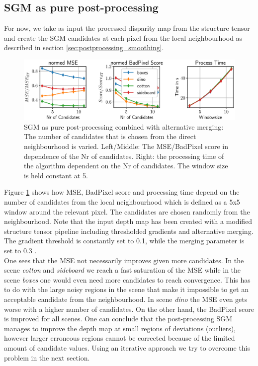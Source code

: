 \documentclass  [
  paper    = a4,
  BCOR     = 10mm,
  twoside,
  fontsize = 12pt,
  fleqn,
  toc      = bibnumbered,
  toc      = listofnumbered,
  numbers  = noendperiod,
  headings = normal,
  listof   = leveldown,
  version  = 3.03
]                                       {scrreprt}
\begin{document}
\subsection{SGM as pure post-processing}
\label{sec:sgmppr_ev}
For now, we take as input the processed disparity map from the structure tensor and create the SGM candidates at each pixel from the local neighbourhood as described in section \ref{sec:postprocessing_smoothing}.
\begin{figure}[h!]
	\centering
	\includegraphics[width=01\linewidth]{images/choose_lower_sgm_ppr_windowsize_5}
	\caption[SGM as pure post-processing combined with alternative merging parameter dependence]{SGM as pure post-processing combined with alternative merging: The number of candidates that is chosen from the direct neighbourhood is varied. Left/Middle: The MSE/BadPixel score in dependence of the Nr of candidates. Right: the processing time of the algorithm dependent on the Nr of candidates. The window size is held constant at 5.}
	\label{fig:chooselowersgmpprwindowsize5}
\end{figure}
Figure \ref{fig:chooselowersgmpprwindowsize5} shows how MSE, BadPixel score and processing time depend on the number of candidates from the local neighbourhood which is defined as a 5x5 window around the relevant pixel. The candidates are chosen randomly from the neighbourhood. Note that the input depth map has been created with a modified structure tensor pipeline including thresholded gradients and alternative merging. The gradient threshold is constantly set to 0.1, while the merging parameter is set to 0.3 .\\
One sees that the MSE not necessarily improves given more candidates. In the scene \textit{cotton} and \textit{sideboard} we reach a fast saturation of the MSE while in the scene \textit{boxes} one would even need more candidates to reach convergence. This has to do with the large noisy regions in the scene that make it impossible to get an acceptable candidate from the neighbourhood. In scene \textit{dino} the MSE even gets worse with a higher number of candidates. On the other hand, the BadPixel score is improved for all scenes. One can conclude that the post-processing SGM manages to improve the depth map at small regions of deviations (outliers), however larger erroneous regions cannot be corrected because of the limited amount of candidate values. Using an iterative approach we try to overcome this problem in the next section.\\ 
\end{document}
